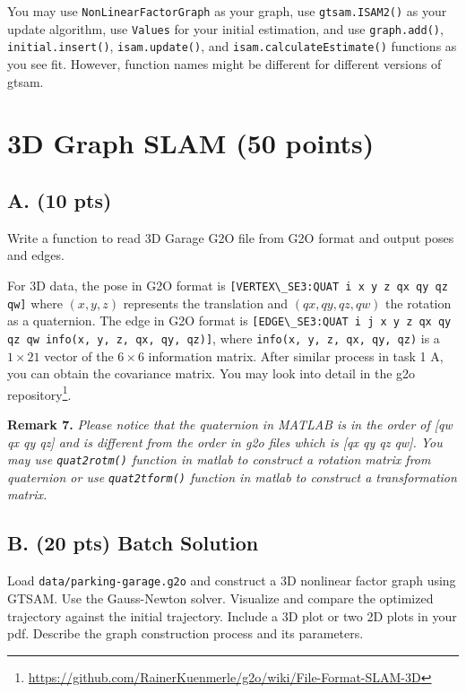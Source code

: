 \documentclass[tp]{lcc}
\begin{document}
You may use \lstinline[style=bash]{NonLinearFactorGraph} as your graph, use \lstinline[style=bash]{gtsam.ISAM2()} as your update algorithm, use \lstinline[style=bash]{Values} for your initial estimation, and use \lstinline[style=bash]{graph.add()}, \lstinline[style=bash]{initial.insert()}, \lstinline[style=bash]{isam.update()}, and \lstinline[style=bash]{isam.calculateEstimate()} functions as you see fit. However, function names might be different for different versions of gtsam.

\section{3D Graph SLAM (50 points)}
\subsection{A. (10 pts)}
Write a function to read 3D Garage G2O file from G2O format and output poses and edges.

For 3D data, the pose in G2O format is \lstinline[style=bash]{[VERTEX\_SE3:QUAT i x y z qx qy qz qw]} where $(x,y,z)$ represents the translation and $(qx,qy,qz,qw)$ the rotation as a quaternion. The edge in G2O format is \lstinline[style=bash]{[EDGE\_SE3:QUAT i j x y z qx qy qz qw info(x, y, z, qx, qy, qz)]}, where \lstinline[style=bash]{info(x, y, z, qx, qy, qz)} is a $1 \times 21$ vector of the $6 \times 6$ information matrix. After similar process in task 1 A, you can obtain the covariance matrix. You may look into detail in the g2o repository\footnote{\url{https://github.com/RainerKuenmerle/g2o/wiki/File-Format-SLAM-3D}}.

\textbf{Remark 7.} \textit{Please notice that the quaternion in MATLAB is in the order of [qw qx qy qz] and is different from the order in g2o files which is [qx qy qz qw]. You may use \lstinline[style=bash]{quat2rotm()} function in matlab to construct a rotation matrix from quaternion or use \lstinline[style=bash]{quat2tform()} function in matlab to construct a transformation matrix.}

\subsection{B. (20 pts) Batch Solution}
Load \lstinline[style=bash]{data/parking-garage.g2o} and construct a 3D nonlinear factor graph using GTSAM. Use the Gauss-Newton solver. Visualize and compare the optimized trajectory against the initial trajectory. Include a 3D plot or two 2D plots in your pdf. Describe the graph construction process and its parameters.
\end{document}
